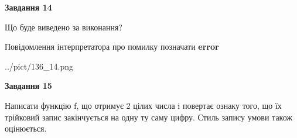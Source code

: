 \documentclass[11pt, ukrainian]{article}
\begin{document}
{\begin {large}
{\begin {center}\textbf{Завдання 14}\end {center}}\par
Що буде виведено за виконання? \par
Повідомлення інтерпретатора про помилку позначати \textbf{error}

\begin{center}
	{../pict/136_14.png}
\end{center}
\newpage

{\begin {center}\textbf{Завдання 15}\end {center}}\par

Написати функцiю f, що отримує 2 цілих числа i повертає ознаку того, що їх трійковий запис закінчується на одну ту саму цифру. Стиль запису умови також оцінюється.\par
\newpage

\end {large}}
\end{document}
